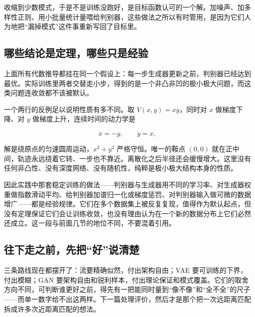 收缩到少数模式，于是不是训练没跑好，是目标函数认可的一个解。加噪声、加多样性正则、用小批量统计量喂给判别器，这些做法之所以有时管用，是因为它们人为地把``漏掉模式''这件事重新写回了目标里。

\subsection{哪些结论是定理，哪些只是经验}

上面所有代数推导都挂在同一个假设上：每一步生成器更新之前，判别器已经达到最优。实际训练里两者交替走小步，得到的是一个非凸非凹的极小极大问题，而这类问题连收敛都不该被默认。

一个两行的反例足以说明性质有多不同。取 \(V(x,y)=xy\)，同时对 \(x\) 做梯度下降、对 \(y\) 做梯度上升，连续时间的动力学是

\[
\dot x=-y,\qquad \dot y=x,
\]

解是绕原点的匀速圆周运动，\(x^2+y^2\) 严格守恒。唯一的鞍点 \((0,0)\) 就在正中间，轨迹永远绕着它转、一步也不靠近。离散化之后半径还会缓慢增大。这里没有任何非凸性、没有深度网络、没有随机性，纯粹是极小极大结构本身的性质。

因此实践中那套稳定训练的做法——判别器与生成器用不同的学习率、对生成器权重做指数滑动平均、给判别器加谱归一化或梯度惩罚、对判别器输入做可微的数据增广——都是经验规律。它们在多个数据集上被反复复现，值得作为默认起点，但没有定理保证它们会让训练收敛，也没有理由认为在一个新的数据分布上它们必然还成立。这一段与前面几节的地位不同，不要混着引用。

\subsection{往下走之前，先把``好''说清楚}

三条路线现在都摆开了：流要精确似然，付出架构自由；VAE 要可训练的下界，付出模糊；GAN 要架构自由和锐利样本，付出理论保证和模式覆盖。它们的取舍方向不同，可判断谁更好之前，得先有一把能同时量到``像不像''和``全不全''的尺子——而单一数字给不出这两样。下一篇处理评价，然后才是那个把一次远距离匹配拆成许多次近距离匹配的想法。
